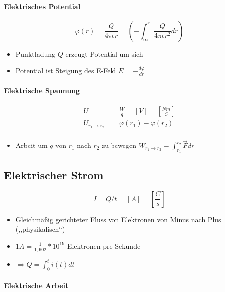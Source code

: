 \paragraph{Elektrisches Potential}

$$\varphi(r) = \frac{Q}{4 \pi \epsilon r} = (-\int_\infty^r \frac{Q}{4 \pi \epsilon r^2} dr)$$

\begin{itemize}
  \item Punktladung $Q$ erzeugt Potential um sich
  \item Potential ist Steigung des E-Feld $E = - \frac{d\varphi}{dr}$
\end{itemize}

\paragraph{Elektrische Spannung}

\begin{align*}
  U                       & = \frac{W}{q} = [V] = [\frac{Nm}{C}] \\
  U_{r_1 \rightarrow r_2} & = \varphi(r_1) - \varphi(r_2)        \\
\end{align*}

\begin{itemize}
  \item Arbeit um $q$ von $r_1$ nach $r_2$ zu bewegen $W_{r_1 \rightarrow r_2} = \int_{r_1}^{r_2} \vec{F}dr$
\end{itemize}

\subsection{Elektrischer Strom}

$$I = Q/t = [A] = \left[\frac{C}{s}\right]$$

\begin{itemize}
  \item Gleichmä\ss ig gerichteter Fluss von Elektronen von Minus nach Plus (,,physikalisch``)
  \item $1A = \frac{1}{1,602} * 10^{19}$ Elektronen pro Sekunde
  \item $\Rightarrow Q = \int_0^t i(t)dt$
\end{itemize}

\paragraph{Elektrische Arbeit}

